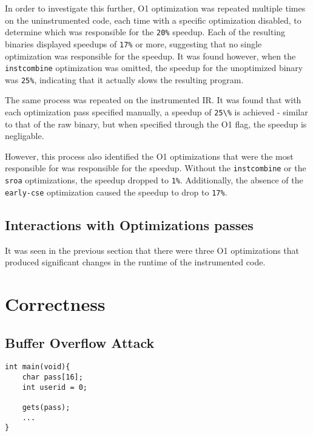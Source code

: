 In order to investigate this further, O1 optimization was repeated multiple times on the uninstrumented code, each time with a specific optimization disabled, to determine which was responsible for the \verb!20%! speedup.
Each of the resulting binaries displayed speedups of \verb!17%! or more, suggesting that no single optimization was responsible for the speedup.
It was found however, when the \verb!instcombine! optimization was omitted, the speedup for the unoptimized binary was \verb!25%!, indicating that it actually slows the resulting program.

The same process was repeated on the instrumented IR.
It was found that with each optimization pass specified manually, a speedup of \verb!25\%! is achieved - similar to that of the raw binary, but when specified through the O1 flag, the speedup is negligable.

However, this process also identified the O1 optimizations that were the most responsible for was responsible for the speedup.
Without the \verb!instcombine! or the \verb!sroa! optimizations, the speedup dropped to \verb!1%!.
Additionally, the absence of the \verb!early-cse! optimization caused the speedup to drop to \verb!17%!.

\subsection{Interactions with Optimizations passes}

It was seen in the previous section that there were three O1 optimizations that produced significant changes in the runtime of the instrumented code.

\section{Correctness}

\subsection{Buffer Overflow Attack}

\begin{verbatim}
int main(void){
    char pass[16];
    int userid = 0;

    gets(pass);
    ...
}
\end{verbatim}

